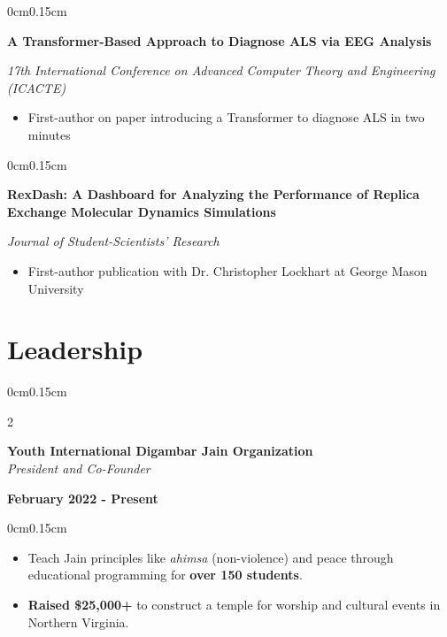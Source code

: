 \documentclass[10pt, letterpaper]{article}
\newenvironment{highlights}{
    \begin{itemize}[topsep=0pt, parsep=0pt, partopsep=0pt, itemsep=0pt, leftmargin=0.6cm]
}{
    \end{itemize}
}
\newenvironment{onecolentry}{
    \begin{adjustwidth}{0cm}{0.15cm}
}{
    \end{adjustwidth}
}
\newenvironment{twocolentry}[2][]{
    \onecolentry
    \def\secondColumn{#2}
    \setcolumnwidth{\fill, 4cm}
    \begin{paracol}{2}
}{
    \switchcolumn \raggedleft \secondColumn
    \end{paracol}
    \endonecolentry
}
\begin{document}
    \vspace{0.05cm}

    \begin{onecolentry}
        \textbf{A Transformer-Based Approach to Diagnose ALS via EEG Analysis}
        
        \textit{17th International Conference on Advanced Computer Theory and Engineering (ICACTE)}
        \begin{highlights}
            \item First-author on paper introducing a Transformer to diagnose ALS in two minutes
        \end{highlights}
    \end{onecolentry}

    \vspace{0.05cm}

    \begin{onecolentry}
        \textbf{RexDash: A Dashboard for Analyzing the Performance of Replica Exchange Molecular Dynamics Simulations}
        
        \textit{Journal of Student-Scientists' Research}
        \begin{highlights}
            \item First-author publication with Dr. Christopher Lockhart at George Mason University
        \end{highlights}
    \end{onecolentry}

    \vspace{0.1cm}

    \section{Leadership}
    \vspace{0.1cm}

    \begin{twocolentry}{\textbf{February 2022 - Present}}
        \textbf{Youth International Digambar Jain Organization} \\
        \textit{President and Co-Founder}
    \end{twocolentry}
    \vspace{-0.1cm}
    \begin{onecolentry}
        \begin{highlights}
            \item Teach Jain principles like \textit{ahimsa} (non-violence) and peace through educational programming for \textbf{over 150 students}.
            \item \textbf{Raised \$25,000+} to construct a temple for worship and cultural events in Northern Virginia.
        \end{highlights}
    \end{onecolentry}
\end{document}
